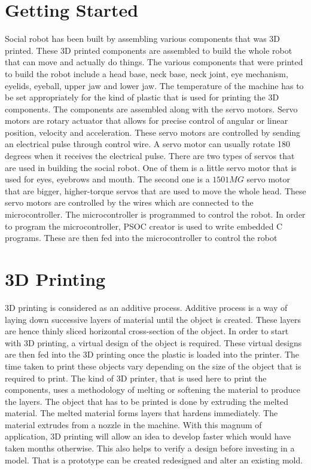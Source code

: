 \documentclass[letterpaper,12pt]{article}
\begin{document}
\begin{multicols}{2}
\section{Getting Started}
Social robot has been built by assembling various components that was 3D printed. These 3D printed components are assembled to build the whole robot that can move and actually do things. The various components that were printed to build the robot include a head base, neck base, neck joint, eye mechanism, eyelids, eyeball, upper jaw and lower jaw. The temperature of the machine has to be set appropriately for the kind of plastic that is used for printing the 3D components. The components are assembled along with the servo motors. Servo motors are rotary actuator that allows for precise control of angular or linear position, velocity and acceleration. These servo motors are controlled by sending an electrical pulse through control wire. A servo motor can usually rotate 180 degrees when it receives the electrical pulse. There are two types of servos that are used in building the social robot. One of them is a little servo motor that is used for eyes, eyebrows and mouth. The second one is a $1501MG$ servo motor that are bigger, higher-torque servos that are used to move the whole head. These servo motors are controlled by the wires which are connected to the microcontroller. The microcontroller is programmed to control the robot. In order to program the microcontroller, PSOC creator is used to write embedded C programs. These are then fed into the microcontroller to control the robot

\section{3D Printing}
3D printing is considered as an additive process. Additive process is a way of laying down successive layers of material until the object is created. These layers are hence thinly sliced horizontal cross-section of the object. In order to start with 3D printing, a virtual design of the object is required. These virtual designs are then fed into the 3D printing once the plastic is loaded into the printer. The time taken to print these objects vary depending on the size of the object that is required to print. The kind of 3D printer, that is used here to print the components, uses a methodology of melting or softening the material to produce the layers. The object that has to be printed is done by extruding the melted material. The melted material forms layers that hardens immediately. The material extrudes from a nozzle in the machine. With this magnum of application, 3D printing will allow an idea to develop faster which would have taken months otherwise. This also helps to verify a design before investing in a model. That is a prototype can be created redesigned and alter an existing mold.


\end{multicols}
\end{document}
